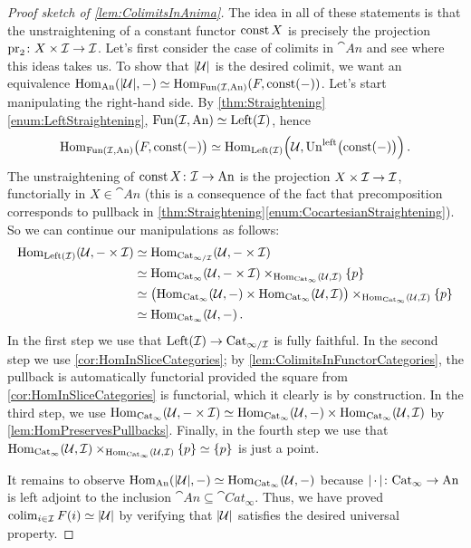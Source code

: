 \begin{proof}[Proof sketch of \cref{lem:ColimitsInAnima}]
	The idea in all of these statements is that the unstraightening of a constant functor $\operatorname{const} X$ is precisely the projection $\operatorname{pr}_2\colon X\times \mathcal{I}\rightarrow \mathcal{I}$. Let's first consider the case of colimits in $\cat{An}$ and see where this ideas takes us. To show that $\abs*{\Uu}$ is the desired colimit, we want an equivalence $\Hom_{\cat{An}}(\abs{\Uu},-)\simeq \Hom_{\Fun(\Ii,\cat{An})}(F,\const(-))$. Let's start manipulating the right-hand side. By \cref{thm:Straightening}\cref{enum:LeftStraightening}, $\operatorname{Fun}(\mathcal{I},\mathrm{An})\simeq\mathrm{Left}(\mathcal{I})$, hence
	\begin{equation*}
		\Hom_{\Fun(\Ii,\cat{An})}\bigl(F,\const(-)\bigr)\simeq \Hom_{\cat{Left}(\Ii)}\left(\Uu,\operatorname{Un}^{\mathrm{left}}\bigl(\const(-)\bigr)\right)\,.
	\end{equation*}
	The unstraightening of $\operatorname{const} X\colon \mathcal{I}\rightarrow\mathrm{An}$ is the projection $X\times \mathcal{I}\rightarrow\mathcal{I}$, functorially in $X\in\cat{An}$ (this is a consequence of the fact that precomposition corresponds to pullback in \cref{thm:Straightening}\cref{enum:CocartesianStraightening}). So we can continue our manipulations as follows:
	\begin{align*}
		\operatorname{Hom}_{\mathrm{Left}(\mathcal{I})}(\mathcal{U},-\times\mathcal{I})&\simeq \operatorname{Hom}_{\mathrm{Cat}_{\infty/\mathcal{I}}}(\mathcal{U},-\times\mathcal{I})\\
		&\simeq \operatorname{Hom}_{\mathrm{Cat}_\infty}(\mathcal{U},-\times\mathcal{I})\times_{\operatorname{Hom}_{\mathrm{Cat}_\infty}(\mathcal{U},\mathcal{I})}\{p\}\\
		&\simeq \bigl(\operatorname{Hom}_{\mathrm{Cat}_\infty}(\mathcal{U},-)\times\operatorname{Hom}_{\mathrm{Cat}_\infty}(\mathcal{U},\mathcal{I})\bigr)\times_{\operatorname{Hom}_{\mathrm{Cat}_\infty}(\mathcal{U},\mathcal{I})}\{p\}\\
		&\simeq \operatorname{Hom}_{\mathrm{Cat}_\infty}(\mathcal{U},-)\,.
	\end{align*}
	In the first step we use that $\mathrm{Left}(\mathcal{I})\rightarrow \mathrm{Cat}_{\infty/\mathcal{I}}$ is fully faithful. In the second step we use \cref{cor:HomInSliceCategories}; by \cref{lem:ColimitsInFunctorCategories}, the pullback is automatically functorial  provided the square from \cref{cor:HomInSliceCategories} is functorial, which it clearly is by construction. In the third step, we use $\operatorname{Hom}_{\mathrm{Cat}_\infty}(\mathcal{U},-\times\mathcal{I})\simeq \operatorname{Hom}_{\mathrm{Cat}_\infty}(\mathcal{U},-)\times\operatorname{Hom}_{\mathrm{Cat}_\infty}(\mathcal{U},\mathcal{I})$ by \cref{lem:HomPreservesPullbacks}. Finally, in the fourth step we use that $\operatorname{Hom}_{\mathrm{Cat}_\infty}(\mathcal{U},\mathcal{I})\times_{\operatorname{Hom}_{\mathrm{Cat}_\infty}(\mathcal{U},\mathcal{I})}\{p\}\simeq \{p\}$ is just a point.
	
	It remains to observe $\Hom_{\cat{An}}(\abs{\Uu},-)\simeq \Hom_{\cat{Cat}_\infty}(\Uu,-)$ because $\abs{\,\cdot\,}\colon \cat{Cat}_\infty\rightarrow\cat{An}$ is left adjoint to the inclusion $\cat{An}\subseteq\cat{Cat}_\infty$. Thus, we have proved $\colimit_{i\in\Ii}F(i)\simeq \abs{\Uu}$ by verifying that $\abs*{\Uu}$ satisfies the desired universal property.
	

\end{proof}
